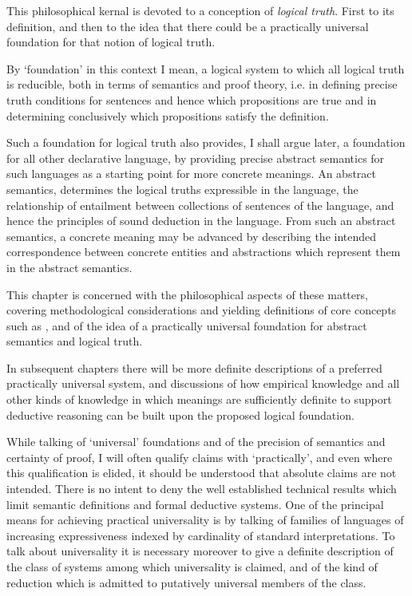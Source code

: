 This philosophical kernal is devoted to a conception of \emph{logical truth}.
First to its definition, and then to the idea that there could be a practically universal foundation for that notion of logical truth.

By `foundation' in this context I mean, a logical system to which all logical truth is reducible, both in terms of semantics and proof theory, i.e. in defining precise truth conditions for sentences and hence which propositions are true and in determining conclusively which propositions satisfy the definition.

Such a foundation for logical truth also provides, I shall argue later, a foundation for all other declarative language, by providing precise abstract semantics for such languages as a starting point for more concrete meanings.
An abstract semantics, determines the logical truths expressible in the language, the relationship of entailment between collections of sentences of the language, and hence the principles of sound deduction in the language.
From such an abstract semantics, a concrete meaning may be advanced by describing the intended correspondence between concrete entities and abstractions which represent them in the abstract semantics.

This chapter is concerned with the philosophical aspects of these matters, covering methodological considerations and yielding definitions of core concepts such as , and of the idea of a practically universal foundation for abstract semantics and logical truth.

In subsequent chapters there will be more definite descriptions of a preferred practically universal system, and discussions of how empirical knowledge and all other kinds of knowledge in which meanings are sufficiently definite to support deductive reasoning can be built upon the proposed logical foundation.

While talking of `universal' foundations and of the precision of semantics and certainty of proof, I will often qualify claims with `practically', and even where this qualification is elided, it should be understood that absolute claims are not intended.
There is no intent to deny the well established technical results which limit semantic definitions and formal deductive systems.
One of the principal means for achieving practical universality is by talking of families of languages of increasing expressiveness indexed by cardinality of standard interpretations.
To talk about universality it is necessary moreover to give a definite description of the class of systems among which universality is claimed, and of the kind of reduction which is admitted to putatively universal members of the class.

